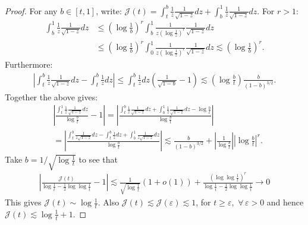 \begin{proof}
			For any $b \in [t,1]$, write: $\mathcal{J}(t) = \int_{t}^{b} \frac{1}{z} \frac{1}{\sqrt{1 - z}} dz + \int_{b}^{1} \frac{1}{z} \frac{1}{\sqrt{1 - z}} dz$. For $r >1$:
			\begin{align*}
				\int_{b}^{1} \frac{1}{z} \frac{1}{\sqrt{1 - z}} dz &\leq \left(\log \frac{1}{b}\right)^r \int_{b}^{1} \frac{1}{z (\log \frac{1}{z})^r} \frac{1}{\sqrt{1 - z}} dz \\
				&\leq \left(\log \frac{1}{b} \right)^r \int_{0}^{1} \frac{1}{z (\log \frac{1}{z})^r} \frac{1}{\sqrt{1 - z}} dz \lesssim \left(\log \frac{1}{b}\right)^r.
			\end{align*}
			Furthermore:
			\begin{align*}
				\left| \int_t^b \frac{1}{z} \frac{1}{\sqrt{1 - z}} dz - \int_t^b \frac{1}{z} dz \right| 
				\leq \int_t^b \frac{1}{z} dz \left( \frac{1}{\sqrt{1 - b}} - 1 \right) \lesssim \left( \log \frac{b}{t} \right) \frac{b}{(1 - b)^{3/2}}.
			\end{align*}
			Together the above gives:
			\begin{align*}
				&\left| \frac{\int_t^1 \frac{1}{z} \frac{1}{\sqrt{1 - z}} dz}{\log \frac{b}{t}} - 1 \right| 
				= \left| \frac{\int_t^b \frac{1}{z} \frac{1}{\sqrt{1 - z}} dz + \int_b^1 \frac{1}{z} \frac{1}{\sqrt{1 - z}} dz - \log \frac{b}{t}}{\log \frac{b}{t}} \right| \\
				&= \left| \frac{\int_t^b \frac{1}{z \sqrt{1 - z}} dz - \int_t^b \frac{1}{z} dz + \int_b^1 \frac{1}{z \sqrt{1 - z}} dz}{\log \frac{b}{t}} \right| \lesssim \frac{b}{(1-b)^{3/2}} + \left| \frac{1}{\log \frac{b}{t}} \right| \left| \log \frac{b}{t} \right|^r.
			\end{align*}
			Take  $b = 1/ \sqrt{\log \frac{1}{t}}$ to see that
			\begin{align*}
				\left| \frac{\mathcal{J}(t)}{\log \frac{1}{t} - \frac{1}{2} \log \log \frac{1}{t}} - 1 \right| \lesssim \frac{1}{\sqrt{\log \frac{1}{t}}} \left( 1 + o(1) \right) + \frac{\left( \log \log \frac{1}{t} \right)^r}{\log \frac{1}{t} - \frac{1}{2} \log \log \frac{1}{t}} \longrightarrow 0
			\end{align*}
			This gives $\mathcal{J}(t) \sim \log \frac{1}{t}$. Also $\mathcal{J}(t) \lesssim \mathcal{J}(\varepsilon) \lesssim 1$, for $t \geq \varepsilon, \, \, \forall \,\varepsilon > 0$ and hence $\mathcal{J}(t) \lesssim \log \frac{1}{t} + 1$.
			

\end{proof}
